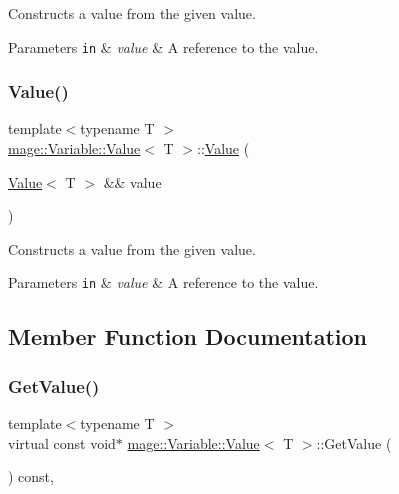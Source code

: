 Constructs a value from the given value.


\begin{DoxyParams}[1]{Parameters}
\mbox{\tt in}  & {\em value} & A reference to the value. \\
\hline
\end{DoxyParams}
\hypertarget{structmage_1_1_variable_1_1_value_a5c6f523b3fbd8547b18420de9a0b372e}{}\label{structmage_1_1_variable_1_1_value_a5c6f523b3fbd8547b18420de9a0b372e} 
\subsubsection{\texorpdfstring{Value()}{Value()}\hspace{0.1cm}{\footnotesize\ttfamily [3/3]}}
{\footnotesize\ttfamily template$<$typename T $>$ \\
\hyperlink{structmage_1_1_variable_1_1_value}{mage\+::\+Variable\+::\+Value}$<$ T $>$\+::\hyperlink{structmage_1_1_variable_1_1_value}{Value} (\begin{DoxyParamCaption}\item[{\hyperlink{structmage_1_1_variable_1_1_value}{Value}$<$ T $>$ \&\&}]{value }\end{DoxyParamCaption})\hspace{0.3cm}{\ttfamily [private]}}

Constructs a value from the given value.


\begin{DoxyParams}[1]{Parameters}
\mbox{\tt in}  & {\em value} & A reference to the value. \\
\hline
\end{DoxyParams}


\subsection{Member Function Documentation}
\hypertarget{structmage_1_1_variable_1_1_value_a04d70496ebb7ad71dafa3df877daeb26}{}\label{structmage_1_1_variable_1_1_value_a04d70496ebb7ad71dafa3df877daeb26} 
\subsubsection{\texorpdfstring{Get\+Value()}{GetValue()}}
{\footnotesize\ttfamily template$<$typename T $>$ \\
virtual const void$\ast$ \hyperlink{structmage_1_1_variable_1_1_value}{mage\+::\+Variable\+::\+Value}$<$ T $>$\+::Get\+Value (\begin{DoxyParamCaption}{ }\end{DoxyParamCaption}) const\hspace{0.3cm}{\ttfamily [override]}, {\ttfamily [virtual]}}

